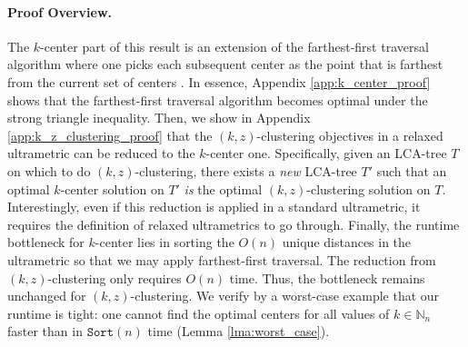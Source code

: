 %
\paragraph{Proof Overview.} The $k$-center part of this result is an extension of the farthest-first traversal algorithm where one picks each subsequent center as the point that is farthest from the current set of centers \citep{farthest_first, Har-Peled}. In essence, Appendix \ref{app:k_center_proof} shows that the farthest-first traversal algorithm becomes optimal under the strong triangle inequality. Then, we show in Appendix \ref{app:k_z_clustering_proof} that the $(k, z)$-clustering objectives in a relaxed ultrametric can be reduced to the $k$-center one. Specifically, given an LCA-tree $T$ on which to do $(k, z)$-clustering, there exists a \emph{new} LCA-tree $T'$ such that an optimal $k$-center solution on $T'$ \emph{is} the optimal $(k, z)$-clustering solution on $T$. Interestingly, even if this reduction is applied in a standard ultrametric, it requires the definition of relaxed ultrametrics to go through.
Finally, the runtime bottleneck for $k$-center lies in sorting the $O(n)$ unique distances in the ultrametric so that we may apply farthest-first traversal. The reduction from $(k, z)$-clustering only requires $O(n)$ time. Thus, the bottleneck remains unchanged for $(k, z)$-clustering. We verify by a worst-case example that our runtime is tight: one cannot find the optimal centers for all values of $k \in \mathbb{N}_n$ faster than in $\texttt{Sort}(n)$ time (Lemma \ref{lma:worst_case}).

